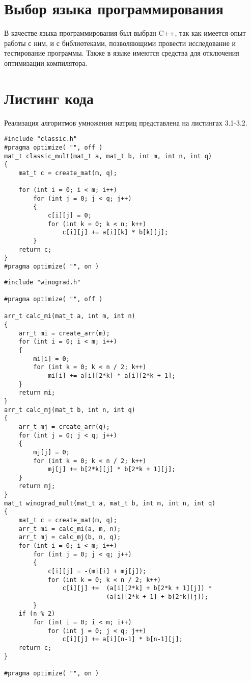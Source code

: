\section{Выбор языка программирования}
В качестве языка программирования был выбран C++, так как имеется опыт работы с ним, и с библиотеками, позволяющими провести исследование и тестирование программы. Также в языке имеются средства для отключения оптимизации компилятора.


\section{Листинг кода}
Реализация алгоритмов умножения матриц представлена на листингах 3.1-3.2.

\begin{lstlisting}[caption = Функция умножения матриц классическим алгоритмом.]
#include "classic.h"
#pragma optimize( "", off )
mat_t classic_mult(mat_t a, mat_t b, int m, int n, int q)
{
	mat_t c = create_mat(m, q);
	
	for (int i = 0; i < m; i++)
		for (int j = 0; j < q; j++)
		{
			c[i][j] = 0;
			for (int k = 0; k < n; k++)
				c[i][j] += a[i][k] * b[k][j];
		}
	return c;
}
#pragma optimize( "", on )
\end{lstlisting}

\begin{lstlisting}[caption = Функция умножения матриц алгоритмом Винограда.]
#include "winograd.h"

#pragma optimize( "", off )

arr_t calc_mi(mat_t a, int m, int n)
{
	arr_t mi = create_arr(m);
	for (int i = 0; i < m; i++)
	{
		mi[i] = 0;
		for (int k = 0; k < n / 2; k++)
			mi[i] += a[i][2*k] * a[i][2*k + 1];
	}
	return mi;
}
arr_t calc_mj(mat_t b, int n, int q)
{
	arr_t mj = create_arr(q);
	for (int j = 0; j < q; j++)
	{
		mj[j] = 0;
		for (int k = 0; k < n / 2; k++)
			mj[j] += b[2*k][j] * b[2*k + 1][j];
	}
	return mj;
}
mat_t winograd_mult(mat_t a, mat_t b, int m, int n, int q)
{
	mat_t c = create_mat(m, q);
	arr_t mi = calc_mi(a, m, n);
	arr_t mj = calc_mj(b, n, q);
	for (int i = 0; i < m; i++)
		for (int j = 0; j < q; j++)
		{
			c[i][j] = -(mi[i] + mj[j]);
			for (int k = 0; k < n / 2; k++)
				c[i][j] +=	(a[i][2*k] + b[2*k + 1][j]) * 
							(a[i][2*k + 1] + b[2*k][j]);
		}
	if (n % 2)
		for (int i = 0; i < m; i++)
			for (int j = 0; j < q; j++)
				c[i][j] += a[i][n-1] * b[n-1][j];
	return c;
}

#pragma optimize( "", on )
\end{lstlisting}

